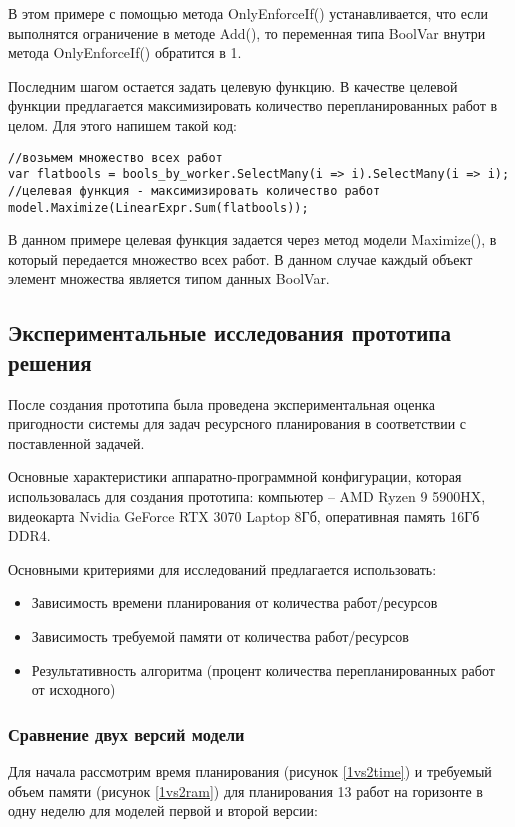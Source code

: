 В этом примере с помощью метода OnlyEnforceIf() устанавливается, что если выполнятся ограничение в методе Add(), то переменная типа BoolVar внутри метода OnlyEnforceIf() обратится в 1.

Последним шагом остается задать целевую функцию. В качестве целевой функции предлагается максимизировать количество перепланированных работ в целом. Для этого напишем такой код:

\begin{verbatim}
//возьмем множество всех работ
var flatbools = bools_by_worker.SelectMany(i => i).SelectMany(i => i);
//целевая функция - максимизировать количество работ
model.Maximize(LinearExpr.Sum(flatbools));
\end{verbatim}

В данном примере целевая функция задается через метод модели Maximize(), в который передается множество всех работ. В данном случае каждый объект элемент множества является типом данных BoolVar.


\subsection{Экспериментальные исследования прототипа решения}

После создания прототипа была проведена экспериментальная оценка пригодности системы для задач ресурсного планирования в соответствии с поставленной задачей.

Основные характеристики аппаратно-программной конфигурации, которая использовалась для создания прототипа: компьютер – AMD Ryzen 9 5900HX, видеокарта Nvidia GeForce RTX 3070 Laptop 8Гб, оперативная память 16Гб DDR4.

Основными критериями для исследований предлагается использовать:
\begin{itemize}
    \item Зависимость времени планирования от количества работ/ресурсов
    \item Зависимость требуемой памяти от количества работ/ресурсов
    \item Результативность алгоритма (процент количества перепланированных работ от исходного)
\end{itemize}

\subsubsection{Сравнение двух версий модели}

Для начала рассмотрим время планирования (рисунок \ref{1vs2time}) и требуемый объем памяти (рисунок \ref{1vs2ram}) для планирования 13 работ на горизонте в одну неделю для моделей первой и второй версии:

